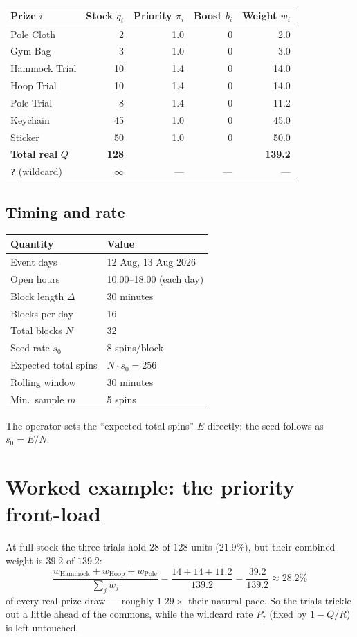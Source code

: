 \documentclass[11pt]{article}
\begin{document}
\begin{center}
\begin{tabular}{l r r r r}
\toprule
Prize $i$ & Stock $q_i$ & Priority $\pi_i$ & Boost $b_i$ & Weight $w_i$ \\
\midrule
Pole Cloth      & 2  & 1.0 & 0 & 2.0 \\
Gym Bag         & 3  & 1.0 & 0 & 3.0 \\
Hammock Trial   & 10 & 1.4 & 0 & 14.0 \\
Hoop Trial      & 10 & 1.4 & 0 & 14.0 \\
Pole Trial      & 8  & 1.4 & 0 & 11.2 \\
Keychain        & 45 & 1.0 & 0 & 45.0 \\
Sticker         & 50 & 1.0 & 0 & 50.0 \\
\midrule
\textbf{Total real} $Q$ & \textbf{128} & & & \textbf{139.2} \\
\texttt{?} (wildcard) & $\infty$ & --- & --- & --- \\
\bottomrule
\end{tabular}
\end{center}

\subsection{Timing and rate}

\begin{center}
\begin{tabular}{l l}
\toprule
Quantity & Value \\
\midrule
Event days & 12 Aug, 13 Aug 2026 \\
Open hours & 10:00--18:00 (each day) \\
Block length $\Delta$ & 30 minutes \\
Blocks per day & 16 \\
Total blocks $N$ & 32 \\
Seed rate $s_0$ & 8 spins/block \\
Expected total spins & $N \cdot s_0 = 256$ \\
Rolling window & 30 minutes \\
Min.\ sample $m$ & 5 spins \\
\bottomrule
\end{tabular}
\end{center}

The operator sets the ``expected total spins'' $E$ directly; the seed follows as
$s_0 = E / N$.

\section{Worked example: the priority front-load}

At full stock the three trials hold $28$ of $128$ units ($21.9\%$), but their
combined weight is $39.2$ of $139.2$:
\begin{equation}
\frac{w_{\text{Hammock}} + w_{\text{Hoop}} + w_{\text{Pole}}}{\sum_j w_j}
= \frac{14 + 14 + 11.2}{139.2} = \frac{39.2}{139.2} \approx 28.2\%
\end{equation}
of every real-prize draw --- roughly $1.29\times$ their natural pace. So the
trials trickle out a little ahead of the commons, while the wildcard rate
$P_?$ (fixed by $1 - Q/R$) is left untouched.
\end{document}
